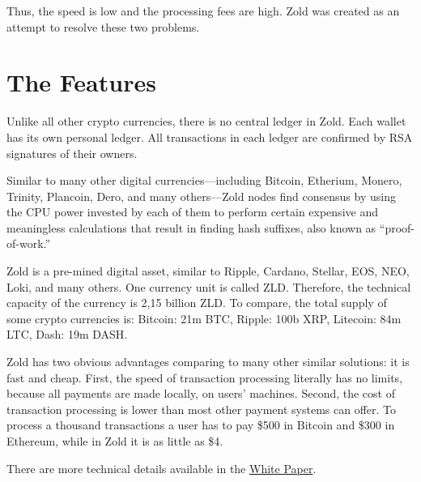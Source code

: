 \documentclass[12pt,oneside]{article}
\begin{document}
Thus, the speed is low and the processing fees are high.
Zold was created as an attempt to resolve these two problems.

\pagebreak

\section*{The Features}

Unlike all other crypto currencies, there is no central ledger in Zold.
Each wallet has its own personal ledger.
All transactions in each ledger are confirmed by RSA signatures of their owners.

Similar to many other digital currencies---including Bitcoin, Etherium, Monero, Trinity, Plancoin, Dero,
and many others---Zold nodes find consensus by using the CPU power invested
by each of them to perform certain expensive and meaningless calculations
that result in finding hash suffixes, also known as ``proof-of-work.''

Zold is a pre-mined digital asset, similar to Ripple, Cardano,
Stellar, EOS, NEO, Loki, and many others.
One currency unit is called ZLD.
Therefore, the technical capacity of the currency is 2,15 billion ZLD.
To compare, the total supply of some crypto currencies is:
Bitcoin: 21m BTC, Ripple: 100b XRP, Litecoin: 84m LTC, Dash: 19m DASH.

Zold has two obvious advantages comparing to many other
similar solutions: it is fast and cheap. First, the speed of transaction processing
literally has no limits, because all payments are made locally, on users'
machines. Second, the cost of transaction processing
is lower than most other payment systems can offer. To process
a thousand transactions a user has to pay \$500 in Bitcoin and \$300 in Ethereum,
while in Zold it is as little as \$4.

There are more technical details available in the
\href{https://papers.zold.io}{White Paper}.
\end{document}
